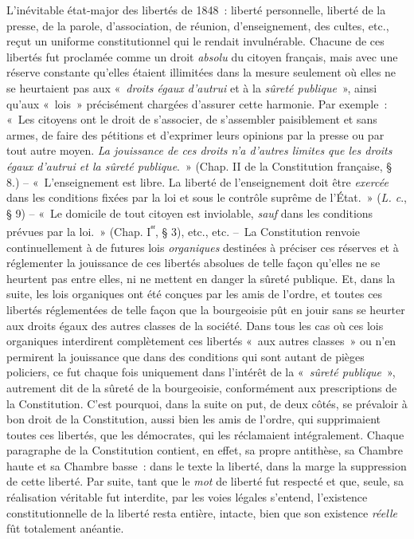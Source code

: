 \documentclass[french,twoside]{book} %
\begin{document}
L’inévitable état-major des libertés de 1848 : liberté personnelle, liberté de la presse, de la parole, d’association, de réunion, d’enseignement, des cultes, etc., reçut un uniforme constitutionnel qui le rendait invulnérable. Chacune de ces libertés fut proclamée comme un droit \emph{absolu} du citoyen français, mais avec une réserve constante qu’elles étaient illimitées dans la mesure seulement où elles ne se heurtaient pas aux « \emph{droits égaux d’autrui} et à la \emph{sûreté publique} », ainsi qu’aux « lois » précisément chargées d’assurer cette harmonie. Par exemple : « Les citoyens ont le droit de s’associer, de s’assembler paisiblement et sans armes, de faire des pétitions et d’exprimer leurs opinions par la presse ou par tout autre moyen. \emph{La jouissance de ces droits n’a d’autres limites que les droits égaux d’autrui et la sûreté publique}. » (Chap. II de la Constitution française, § 8.) – « L’enseignement est libre. La liberté de l’enseignement doit être \emph{exercée} dans les conditions fixées par la loi et sous le contrôle suprême de l’État. » (\emph{L. c}., § 9) – « Le domicile de tout citoyen est inviolable, \emph{sauf} dans les conditions prévues par la loi. » (Chap. I\textsuperscript{ᵉʳ}, § 3), etc., etc. – La Constitution renvoie continuellement à de futures lois \emph{organiques} destinées à préciser ces réserves et à réglementer la jouissance de ces libertés absolues de telle façon qu’elles ne se heurtent pas entre elles, ni ne mettent en danger la sûreté publique. Et, dans la suite, les lois organiques ont été conçues par les amis de l’ordre, et toutes ces libertés réglementées de telle façon que la bourgeoisie pût en jouir sans se heurter aux droits égaux des autres classes de la société. Dans tous les cas où ces lois organiques interdirent complètement ces libertés « aux autres classes » ou n’en permirent la jouissance que dans des conditions qui sont autant de pièges policiers, ce fut chaque fois uniquement dans l’intérêt de la « \emph{sûreté publique} », autrement dit de la sûreté de la bourgeoisie, conformément aux prescriptions de la Constitution. C’est pourquoi, dans la suite on put, de deux côtés, se prévaloir à bon droit de la Constitution, aussi bien les amis de l’ordre, qui supprimaient toutes ces libertés, que les démocrates, qui les réclamaient intégralement. Chaque paragraphe de la Constitution contient, en effet, sa propre antithèse, sa Chambre haute et sa Chambre basse : dans le texte la liberté, dans la marge la suppression de cette liberté. Par suite, tant que le \emph{mot} de liberté fut respecté et que, seule, sa réalisation véritable fut interdite, par les voies légales s’entend, l’existence constitutionnelle de la liberté resta entière, intacte, bien que son existence \emph{réelle} fût totalement anéantie.\par
\end{document}
